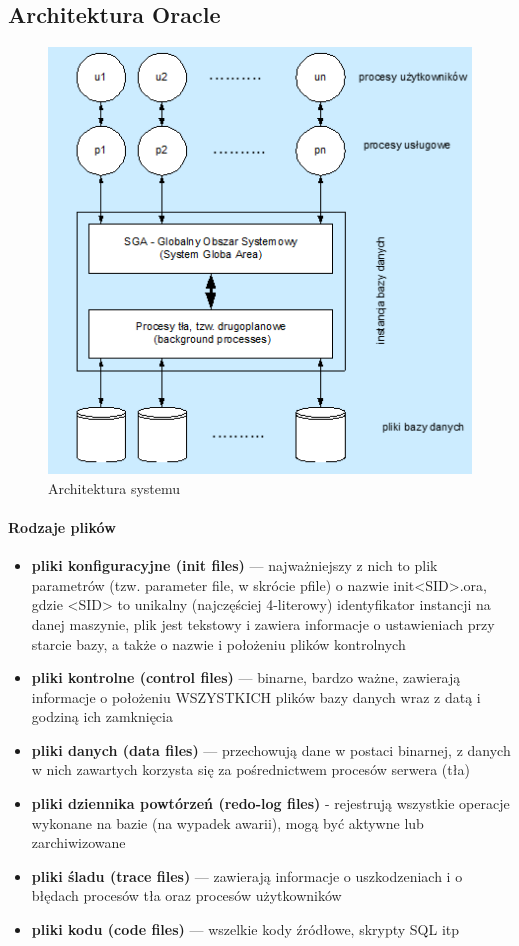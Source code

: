 \documentclass[a4paper,twoside]{report}
\begin{document}
\subsection{Architektura Oracle}

\begin{figure}[htbp]
\centering
\includegraphics[scale=0.7]{obrazy/archoracle.png}
\caption{Architektura systemu}
\end{figure}


\medskip 
\paragraph{Rodzaje plików}

\begin{itemize}
\item \textbf{pliki konfiguracyjne (init files)} — najważniejszy z nich to plik parametrów (tzw. parameter file, w skrócie pfile) o nazwie init<SID>.ora, gdzie <SID> to unikalny (najczęściej 4-literowy) identyfikator instancji na danej maszynie, plik jest tekstowy i zawiera informacje o ustawieniach przy starcie bazy, a także o nazwie i położeniu plików kontrolnych
\item \textbf{pliki kontrolne (control files)} — binarne, bardzo ważne, zawierają informacje o położeniu WSZYSTKICH plików bazy danych wraz z datą i godziną ich zamknięcia
\item \textbf{pliki danych (data files)} — przechowują dane w postaci binarnej, z danych w nich zawartych korzysta się za pośrednictwem procesów serwera (tła)
\item \textbf{ pliki dziennika powtórzeń (redo-log files)} - rejestrują wszystkie operacje wykonane na bazie (na wypadek awarii), mogą być aktywne lub zarchiwizowane 
\item \textbf{pliki śladu (trace files)} — zawierają informacje o uszkodzeniach i o błędach procesów tła oraz procesów użytkowników
\item\textbf{ pliki kodu (code files)} — wszelkie kody źródłowe, skrypty SQL itp 
\end{itemize}
\end{document}
